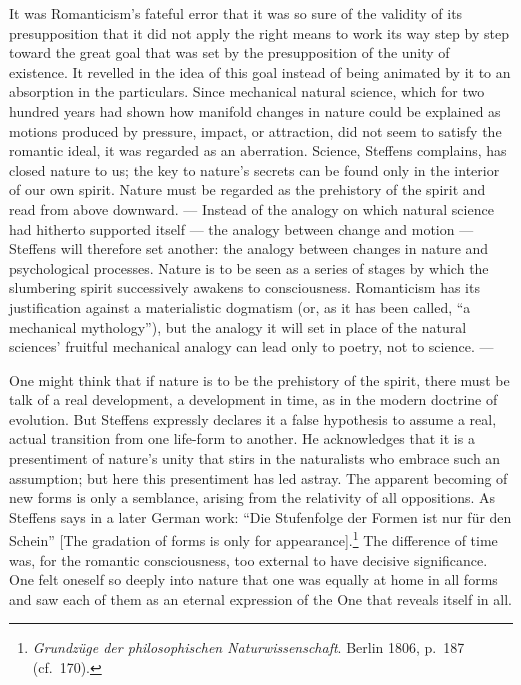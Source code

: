 \documentclass[12pt,a4paper]{book}
\newcommand{\opage}[1]{\marginnote{\footnotesize\textit{[#1]}}}
\begin{document}
It was Romanticism's fateful error that it was so sure of the validity of its
presupposition that it did not apply the right means to work its way step by step
toward the great goal that was set by the presupposition of the unity of existence.
It revelled in the idea of this goal instead of being animated by it to an
absorption in the particulars. Since mechanical natural science, which for two
hundred years had shown how manifold changes in nature could be explained as motions
produced by pressure, impact, or attraction, did not seem to satisfy the romantic
ideal, it was regarded as an aberration. \opage{45}Science, Steffens complains, has closed
nature to us; the key to nature's secrets can be found only in the interior of our
own spirit. Nature must be regarded as the prehistory of the spirit and read from
above downward. --- Instead of the analogy on which natural science had hitherto
supported itself --- the analogy between change and motion --- Steffens will
therefore set another: the analogy between changes in nature and psychological
processes. Nature is to be seen as a series of stages by which the slumbering spirit
successively awakens to consciousness. Romanticism has its justification against a
materialistic dogmatism (or, as it has been called, ``a mechanical mythology''), but
the analogy it will set in place of the natural sciences' fruitful mechanical
analogy can lead only to poetry, not to science. ---

One might think that if nature is to be the prehistory of the spirit, there must be
talk of a real development, a development in time, as in the modern doctrine of
evolution. But Steffens expressly declares it a false hypothesis to assume a real,
actual transition from one life-form to another. He acknowledges that it is a
presentiment of nature's unity that stirs in the naturalists who embrace such an
assumption; but here this presentiment has led astray. The apparent becoming of new
forms is only a semblance, arising from the relativity of all oppositions. As
Steffens says in a later German work: ``Die Stufenfolge der Formen ist nur für den
Schein'' [The gradation of forms is only for appearance].\footnote{\emph{Grundzüge
der philosophischen Naturwissenschaft}. Berlin 1806, p.~187 (cf.\ 170).} The
difference of time was, for the romantic consciousness, too external to have
decisive significance. One felt oneself so deeply into nature that one was equally
at home in all forms and saw each of them as an eternal expression of the One that
reveals itself in all.
\end{document}
